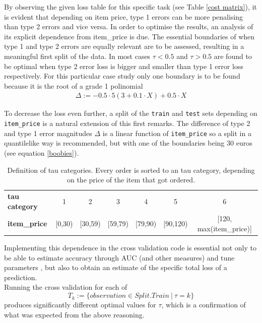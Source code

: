\documentclass[a4paper,12pt]{article}
\begin{document}
By observing the given loss table for this specific task (see Table \ref{cost matrix}), it is evident that depending on item price, type 1 errors can be more penalising than type 2 errors and vice versa.
In order  to optimise the results, an analysis of its explicit dependence from item\_price is due.
\newline
The essential boundaries of when type 1 and type 2 errors are equally relevant are to be assessed, resulting in a meaningful first split of the data. In most cases $\tau<0.5$ and $\tau>0.5$ are found to be optimal when type 2 error loss is bigger and smaller than type 1 error loss respectively.
  \newline
 For this particular case study only one boundary is to be found because it is the root of a grade 1 polinomial 
 \begin{eqnarray}
 \Delta:=-0.5 \cdot 5(3+0.1 \cdot X)+0.5 \cdot X
 \label{boobies}
 \end{eqnarray}
 
To decrease the loss even further, a split of the \texttt{train} and \texttt{test} sets depending on \texttt{item\_price} is a natural extension of this first remarks.
The difference of type 2 and type 1 error magnitudes $\Delta$ is a linear function of \texttt{item\_price} so a split in a quantile\-like way is recommended, but with one of the boundaries being $30$ euros (see equation \ref{boobies}).
\begin{center}
\begin{table}[h]
\begin{tabular}{|l|| c | c | c | c | c | c |}
\hline
\textbf{tau category} & 1 & 2 & 3 & 4 & 5 & 6 \\
\textbf{item\_price}  & {[}0,30)   & {[}30,59)   & {[}59,79)  & {[}79,90)   & {[}90,120)    & {[}120, max(item\_price){]} \\
\hline
\end{tabular}
 \caption{Definition of tau categories. Every order is sorted to an tau category, depending on the price of the item that got ordered.}
 \label{Table::Tau}
\end{table}
\end{center}
Implementing this dependence in the cross validation code is essential not only to be able to estimate accuracy through AUC (and other measures) and tune parameters , but also to obtain an estimate of the specific total loss of a prediction.\\
Running the cross validation for each of $$T_k:=\{observation \in Split.Train \ | \ \tau = k\}$$ produces significantly different optimal values for $\tau$, which is a confirmation of what was expected from the above reasoning. 
\end{document}

